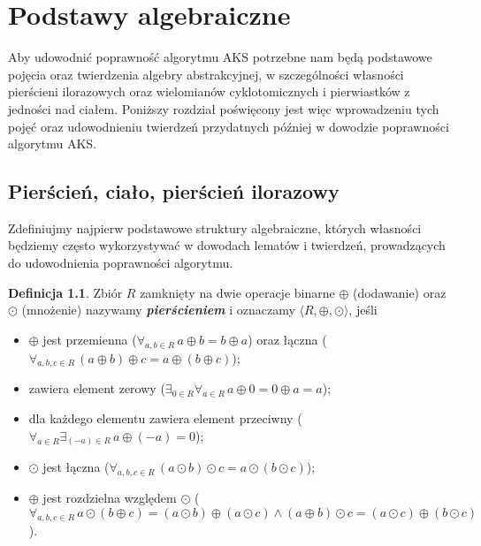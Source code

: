 \documentclass[declaration,shortabstract]{iithesis}
\theoremstyle{definition}
\newtheorem{definition}{Definicja}
\theoremstyle{remark} \newtheorem{observation}{Obserwacja}
\theoremstyle{plain} \newtheorem{theorem}{Twierdzenie}
\theoremstyle{plain} \newtheorem{lemma}{Lemat}
\theoremstyle{remark} \newtheorem*{remark*}{Uwaga}
\theoremstyle{reminder} \newtheorem*{reminder*}{Przypomnienie}
\begin{document}
\chapter{Podstawy algebraiczne}

Aby udowodnić poprawność algorytmu AKS potrzebne nam będą podstawowe pojęcia oraz twierdzenia algebry abstrakcyjnej, w szczególności własności pierścieni ilorazowych oraz wielomianów cyklotomicznych i pierwiastków z jedności nad ciałem. Poniższy rozdział poświęcony jest więc wprowadzeniu tych pojęć oraz udowodnieniu twierdzeń przydatnych później w dowodzie poprawności algorytmu AKS.

\section{Pierścień, ciało, pierścień ilorazowy}

Zdefiniujmy najpierw podstawowe struktury algebraiczne, których własności będziemy często wykorzystywać w dowodach lematów i twierdzeń, prowadzących do udowodnienia poprawności algorytmu.

\theoremstyle{definition} 
\begin{definition}
	Zbiór $R$ zamknięty na dwie operacje binarne $\oplus$ (dodawanie) oraz $\odot$ (mnożenie) nazywamy \textit{\textbf{pierścieniem}} i oznaczamy $\langle R, \oplus, \odot \rangle$, jeśli 
	\begin{itemize}[leftmargin=.4in]
		\item $\oplus$ jest przemienna ($\forall_{a, b \in R} \, a \oplus b = b \oplus a$) oraz łączna ($\forall_{a, b, c \in R} \, (a \oplus b) \oplus c = a \oplus (b \oplus c)$);
		\item zawiera element zerowy ($\exists_{0 \in R} \forall_{a \in R} \, a \oplus 0 = 0 \oplus a = a$);
		\item dla każdego elementu zawiera element przeciwny ($\forall_{a \in R} \exists_{(-a) \in R} \, a \oplus (-a) = 0$);
		\item $\odot$ jest łączna ($\forall_{a, b, c \in R} \, (a \odot b) \odot c = a \odot (b \odot c)$);
		\item $\oplus$ jest rozdzielna względem $\odot$ ($\forall_{a, b, c \in R} \, a \odot (b \oplus c) = (a \odot b) \oplus (a \odot c) \wedge (a \oplus b) \odot c = (a \odot c) \oplus (b \odot c)$).
	\end{itemize}
\end{definition}
\end{document}
